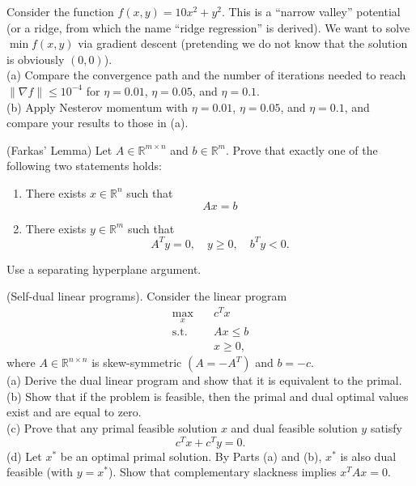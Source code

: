 \begin{myexercise}
Consider the function $f(x,y)=10x^2+y^2$. This is a ``narrow valley'' potential (or a ridge, from which the name ``ridge regression'' is derived).  We want to solve $\min f(x,y)$ via gradient descent (pretending we do not know that the solution is obviously $(0,0)$). \\
(a) Compare the convergence path and the number of iterations needed to reach $\|\nabla f\| \le 10^{-4}$ for $\eta = 0.01$, $\eta = 0.05$, and $\eta = 0.1$. \\
(b) Apply Nesterov momentum with $\eta = 0.01$, $\eta = 0.05$, and $\eta = 0.1$, and compare your results to those in (a).
\end{myexercise}

\begin{myexercise} (Farkas’ Lemma) Let $A \in \mathbb{R}^{m \times n}$ and $b \in \mathbb{R}^m$. Prove that exactly one of the following two statements holds:
\begin{enumerate}
\item There exists $x \in \mathbb{R}^n$ such that
$$ Ax = b$$
\item There exists $y \in \mathbb{R}^m$ such that
$$A^T y = 0,\quad y \ge 0,\quad b^T y < 0.$$
\end{enumerate}
\begin{hint}
    Use a separating hyperplane argument.
\end{hint}
\end{myexercise}

\begin{myexercise} (Self-dual linear programs).
Consider the linear program
\begin{align*}
\max_x & \quad c^T x \\
\text{s.t.} & \quad Ax \le b \\
& \quad x \ge 0,
\end{align*}
where $A \in \mathbb{R}^{n \times n}$ is skew-symmetric $(A = -A^T)$ and $b = -c$. \\
(a) Derive the dual linear program and show that it is equivalent to the primal. \\
(b) Show that if the problem is feasible, then the primal and dual optimal values exist and are equal to zero. \\
(c) Prove that any primal feasible solution $x$ and dual feasible solution $y$ satisfy
$$
c^T x + c^T y = 0.
$$
(d) Let $x^*$ be an optimal primal solution. By Parts (a) and (b), $x^*$ is also dual feasible (with $y = x^*$).
Show that complementary slackness implies $x^T A x = 0$. 
\end{myexercise}

